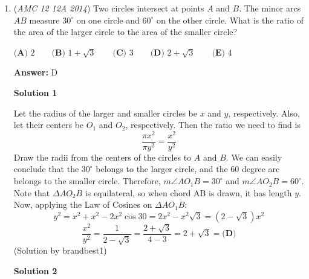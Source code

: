 \begin{enumerate}
\textbf{Solution 3}

Let the total distance be $d$, and let the time taken after the speed change be $t$. Then $d=35(t+1)$. Since 1 hour has passed, and he increased his speed by $15$ miles per hour, and he had already traveled $35$ miles, the new equation is $d-35=50(t-1-\frac{1}{2})=50(t-\frac{3}{2})$. Solving, $d=35t+35=50t-40$, $15t=75$, $t=5$, and $d=35(5+1)=35\cdot 6=210 \Longrightarrow \boxed{\textbf{(C) } 210}$.

 


	\item (\textit{AMC 12 12A 2014}) Two circles intersect at points $A$ and $B$.  The minor arcs $AB$ measure $30^\circ$ on one circle and $60^\circ$ on the other circle.  What is the ratio of the area of the larger circle to the area of the smaller circle?


 $\textbf{(A) }2\qquad \textbf{(B) }1+\sqrt3\qquad \textbf{(C) }3\qquad \textbf{(D) }2+\sqrt3\qquad \textbf{(E) }4\qquad$

 \textbf{Answer: }D



\textbf{Solution 1}

Let the radius of the larger and smaller circles be $x$ and $y$, respectively. Also, let their centers be $O_1$ and $O_2$, respectively. Then the ratio we need to find is
 \[\dfrac{\pi x^2}{\pi y^2} = \dfrac{x^2}{y^2}\]Draw the radii from the centers of the circles to $A$ and $B$. We can easily conclude that the $30^{\circ}$ belongs to the larger circle, and the $60$ degree arc belongs to the smaller circle. Therefore, $m\angle AO_1B = 30^{\circ}$ and $m\angle AO_2B = 60^{\circ}$. Note that $\Delta AO_2B$ is equilateral, so when chord AB is drawn, it has length $y$. Now, applying the Law of Cosines on $\Delta AO_1B$:
 \[y^2 = x^2 + x^2 - 2x^2\cos{30} = 2x^2 - x^2\sqrt{3} = (2 - \sqrt{3})x^2\]
 \[\dfrac{x^2}{y^2} = \dfrac{1}{2 - \sqrt{3}} = \dfrac{2 + \sqrt{3}}{4-3} = 2 + \sqrt{3}=\boxed{\textbf{(D)}}\](Solution by brandbest1)

 



\textbf{Solution 2}


\end{enumerate}
